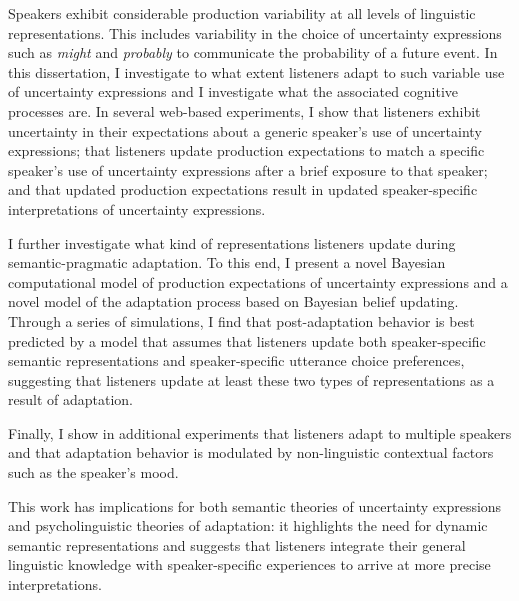Speakers exhibit considerable production variability at all levels of linguistic representations. This includes variability in the choice of uncertainty expressions such as \textit{might} and \textit{probably} to communicate the probability of a future event. In this dissertation, I investigate to what extent listeners adapt to such variable use of uncertainty expressions and I investigate what the associated cognitive processes are. In several web-based experiments, I show that listeners exhibit uncertainty in their expectations about a generic speaker's use of uncertainty expressions;  that listeners update production expectations to match a specific speaker's use of uncertainty expressions after a brief exposure to that speaker; and that updated production expectations result in updated speaker-specific interpretations of uncertainty expressions. 

I further investigate what kind of representations listeners update during semantic-pragmatic adaptation. To this end, I  present a novel Bayesian computational model of production expectations of uncertainty expressions and a novel model of the adaptation process based on Bayesian belief updating.  Through a series of simulations, I find that post-adaptation behavior is best predicted by a model that assumes that listeners update both speaker-specific semantic representations and speaker-specific utterance choice preferences, suggesting that listeners update at least these two types of representations as a result of adaptation. 

Finally, I show in additional experiments that listeners adapt to multiple speakers and that adaptation behavior is modulated by non-linguistic contextual factors such as the speaker's mood. 

This work has implications for both semantic theories of uncertainty expressions and psycholinguistic theories of adaptation: it highlights the need for dynamic semantic representations and suggests that listeners integrate their general linguistic knowledge with speaker-specific experiences to arrive at more precise interpretations.



